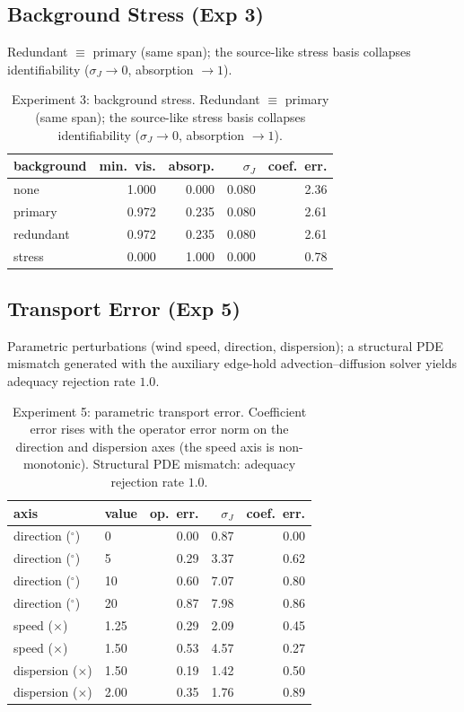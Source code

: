 \subsection{Background Stress (Exp 3)}
Redundant $\equiv$ primary (same span); the source-like stress basis collapses
identifiability ($\sigma_J\!\to\!0$, absorption $\to\!1$).
\begin{table}[t]
\centering
\footnotesize
\caption{Experiment 3: background stress. Redundant $\equiv$ primary (same span);
the source-like stress basis collapses identifiability ($\sigma_J\!\to\!0$,
absorption $\to\!1$).}
\label{tab:results_h3}
\begin{tabular}{lrrrr}
\toprule
background & min.\ vis. & absorp. & $\sigma_J$ & coef.\ err. \\
\midrule
none      & 1.000 & 0.000 & 0.080 & 2.36 \\
primary   & 0.972 & 0.235 & 0.080 & 2.61 \\
redundant & 0.972 & 0.235 & 0.080 & 2.61 \\
stress    & 0.000 & 1.000 & 0.000 & 0.78 \\
\bottomrule
\end{tabular}
\end{table}

\subsection{Transport Error (Exp 5)}
\label{subsec:results_h5a}
Parametric perturbations (wind speed, direction, dispersion); a structural PDE
mismatch generated with the auxiliary edge-hold advection--diffusion solver yields
adequacy rejection rate $1.0$.
\begin{table}[t]
\centering
\footnotesize
\caption{Experiment 5: parametric transport error. Coefficient error rises with
the operator error norm on the direction and dispersion axes (the speed axis is
non-monotonic). Structural PDE mismatch: adequacy rejection rate $1.0$.}
\label{tab:results_h5a}
\begin{tabular}{llrrr}
\toprule
axis & value & op.\ err. & $\sigma_J$ & coef.\ err. \\
\midrule
direction ($^\circ$) & 0  & 0.00 & 0.87 & 0.00 \\
direction ($^\circ$) & 5  & 0.29 & 3.37 & 0.62 \\
direction ($^\circ$) & 10 & 0.60 & 7.07 & 0.80 \\
direction ($^\circ$) & 20 & 0.87 & 7.98 & 0.86 \\
speed ($\times$)     & 1.25 & 0.29 & 2.09 & 0.45 \\
speed ($\times$)     & 1.50 & 0.53 & 4.57 & 0.27 \\
dispersion ($\times$)& 1.50 & 0.19 & 1.42 & 0.50 \\
dispersion ($\times$)& 2.00 & 0.35 & 1.76 & 0.89 \\
\bottomrule
\end{tabular}
\end{table}

